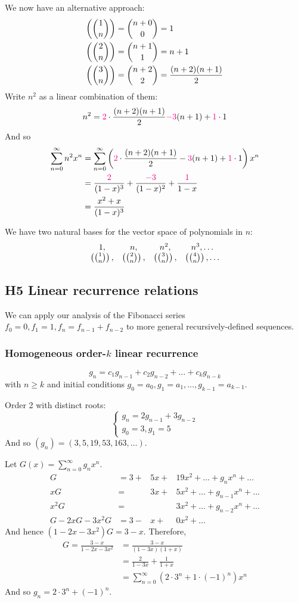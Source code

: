 \documentclass[12pt]{article}
\begin{document}
We now have an alternative approach:
\begin{align*}
    \left({1\choose n}\right) &= {n+0\choose 0}=1\\
    \left({2\choose n}\right) &= {n+1\choose 1}=n+1\\
    \left({3\choose n}\right) &= {n+2\choose 2} = \frac{(n+2)(n+1)}{2}
\end{align*}
Write $n^2$ as a linear combination of them:\[n^2 = \textcolor{magenta}{2}\cdot \frac{(n+2)(n+1)}{2} \textcolor{magenta}{-3}(n+1)+\textcolor{magenta}{1}\cdot1\]
And so \begin{align*}
    \sum_{n=0}^{\infty}n^2x^n &= \sum_{n=0}^{\infty}\left(\textcolor{magenta}{2}\cdot \frac{(n+2)(n+1)}{2} -\textcolor{magenta}{3}(n+1)+\textcolor{magenta}{1}\cdot1\right)x^n\\
    &= \frac{\textcolor{magenta}{2}}{(1-x)^3}+\frac{\textcolor{magenta}{-3}}{(1-x)^2}+\frac{\textcolor{magenta}{1}}{1-x}\\
    &= \frac{x^2+x}{(1-x)^3}
\end{align*}

\rmk We have two natural bases for the vector space of polynomials in $n$:\[\begin{matrix}
    1,&n,&n^2,&n^3,\dots\\
    \left({1\choose n}\right),&\left({2\choose n}\right),&\left({3\choose n}\right),&\left({4\choose n}\right),\dots
\end{matrix}\]

\subsection{H5 Linear recurrence relations}
We can apply our analysis of the Fibonacci series $f_0=0,f_1=1,f_n=f_{n-1}+f_{n-2}$ to more general recursively-defined sequences.

\subsubsection{Homogeneous order-$k$ linear recurrence}
\[g_n=c_{1}g_{n-1} + c_{2}g_{n-2} +\dots + c_{k}g_{n-k}\]
with $n\geq k$ and initial conditions $g_0=a_0, g_1=a_1,\dots, g_{k-1}=a_{k-1}$.

\eg Order 2 with distinct roots: \[\begin{cases}
    g_n = 2g_{n-1}+3g_{n-2}\\
    g_0=3,g_1=5
\end{cases}\]
And so $(g_n)=(3,5,19,53,163,\dots)$.

Let $G(x)=\sum_{n=0}^{\infty}g_nx^n$.
\[\begin{array}{rlll}
    G &= 3+&5x+ & 19x^2+   \dots +g_nx^n+\dots \\
    xG &= &3x+& 5x^2+\dots +g_{n-1}x^n+\dots\\
    x^2G &= && 3x^2 + \dots +g_{n-2}x^n+\dots\\ \hline
    G-2xG-3x^2G &= 3-&x + & 0x^2 + \dots
    \end{array}
    \]
And hence $(1-2x-3x^2)G=3-x$. Therefore, \begin{align*}
    G= \frac{3-x}{1-2x-3x^2} &= \frac{3-x}{(1-3x)(1+x)}\\
    &= \frac{2}{1-3x}+\frac{1}{1+x}\\
    &= \sum_{n=0}^{\infty}(2\cdot 3^n + 1\cdot(-1)^n)x^n
\end{align*}
And so $g_n=2\cdot 3^n + (-1)^n$.
\end{document}
